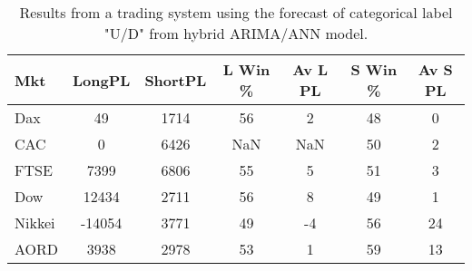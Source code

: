 \begin{table}[ht]
\centering
\caption[Results from a trading system using the forecast of categorical label "U/D" from hybrid ARIMA/ANN model]{Results from a trading system using the forecast of categorical label "U/D" from hybrid ARIMA/ANN model.} 
\label{tab:chp_ts:pUD_CAT_arima_ann_sys}
\begin{tabular}{lcccccc}
  \toprule Mkt & LongPL & ShortPL & L Win \% & Av L PL & S Win \% & Av S PL \\ 
  \midrule Dax & 49 & 1714 & 56 & 2 & 48 & 0 \\ 
  CAC & 0 & 6426 & NaN & NaN & 50 & 2 \\ 
  FTSE & 7399 & 6806 & 55 & 5 & 51 & 3 \\ 
  Dow & 12434 & 2711 & 56 & 8 & 49 & 1 \\ 
  Nikkei & -14054 & 3771 & 49 & -4 & 56 & 24 \\ 
  AORD & 3938 & 2978 & 53 & 1 & 59 & 13 \\ 
   \bottomrule \end{tabular}
\end{table}
